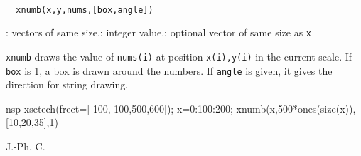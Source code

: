 
\begin{mandesc}
  \\ %
\end{mandesc}
\begin{calling_sequence}
\begin{verbatim}
  xnumb(x,y,nums,[box,angle])  
\end{verbatim}
\end{calling_sequence}

\begin{parameters}
  \begin{varlist}
    : vectors of same size.: integer value.: optional vector of same size as \verb!x!\end{varlist}
\end{parameters}

\begin{mandescription}
  \verb!xnumb! draws the value of \verb!nums(i)!
  at position \verb!x(i),y(i)! in the current scale.
  If \verb!box! is 1, a box is drawn around the numbers. 
  If \verb!angle! is given, it gives the direction for string drawing.
\end{mandescription}

\begin{examples}
  \begin{mintednsp}{nsp}
    xsetech(frect=[-100,-100,500,600]);
    x=0:100:200;
    xnumb(x,500*ones(size(x)),[10,20,35],1)
  \end{mintednsp}
\end{examples}
\begin{manseealso}
\end{manseealso}

\begin{authors}
  J.-Ph. C.  
\end{authors}

